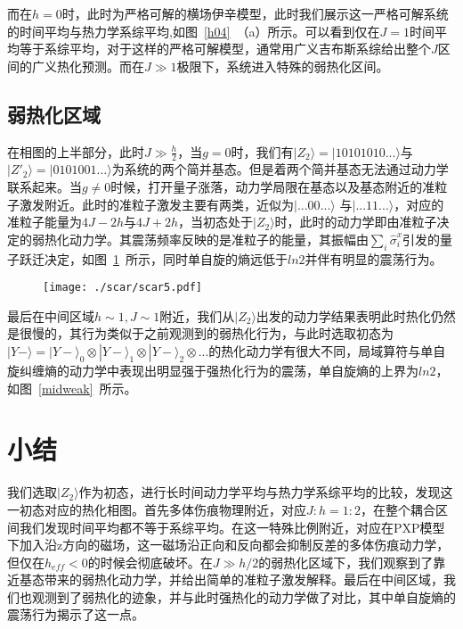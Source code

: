 而在$h=0$时，此时为严格可解的横场伊辛模型，此时我们展示这一严格可解系统的时间平均与热力学系综平均,如图~\ref{h04}~（a）所示。可以看到仅在$J=1$时间平均等于系综平均，对于这样的严格可解模型，通常用广义吉布斯系综给出整个$J$区间的广义热化预测\cite{vidmar2016generalized}。而在$J\gg 1$极限下，系统进入特殊的弱热化区间。



\subsection{弱热化区域}
在相图的上半部分，此时$J \gg \frac{h}{2}$，当$g=0$时，我们有$|Z_2\rangle=|10101010...\rangle$与$|Z'_{2}\rangle=|0101001...\rangle$为系统的两个简并基态。但是着两个简并基态无法通过动力学联系起来。当$g\neq 0$时候，打开量子涨落，动力学局限在基态以及基态附近的准粒子激发附近。此时的准粒子激发主要有两类，近似为$|...00...\rangle$
与$|...11...\rangle$，对应的准粒子能量为$4J-2h$与$4J+2h$，当初态处于$|Z_2\rangle$时，此时的动力学即由准粒子决定的弱热化动力学。其震荡频率反映的是准粒子的能量，其振幅由$\sum_i \hat{\sigma}_i^x$引发的量子跃迁决定，如图~\ref{weak}~所示，同时单自旋的熵远低于$ln2$并伴有明显的震荡行为。
\begin{figure}[h]
\centering
\texttt{[image: ./scar/scar5.pdf]}
\label{weak}
\end{figure}

最后在中间区域$h\sim 1, J \sim 1$附近，我们从$|Z_2\rangle$出发的动力学结果表明此时热化仍然是很慢的，其行为类似于之前观测到的弱热化行为，与此时选取初态为$|Y-\rangle = |Y-\rangle_0 \otimes|Y-\rangle_1\otimes |Y-\rangle_2 \otimes... $的热化动力学有很大不同，局域算符与单自旋纠缠熵的动力学中表现出明显强于强热化行为的震荡，单自旋熵的上界为$ln2$，如图~\ref{midweak}~所示。

\section{小结}\label{4sec:sum}
我们选取$|Z_2\rangle$作为初态，进行长时间动力学平均与热力学系综平均的比较，发现这一初态对应的热化相图。首先多体伤痕物理附近，对应$J:h=1:2$，在整个耦合区间我们发现时间平均都不等于系综平均。在这一特殊比例附近，对应在PXP模型下加入沿z方向的磁场，这一磁场沿正向和反向都会抑制反差的多体伤痕动力学，但仅在$h_{eff}<0$的时候会彻底破坏。在$J\gg h/2$的弱热化区域下，我们观察到了靠近基态带来的弱热化动力学，并给出简单的准粒子激发解释。最后在中间区域，我们也观测到了弱热化的迹象，并与此时强热化的动力学做了对比，其中单自旋熵的震荡行为揭示了这一点。



